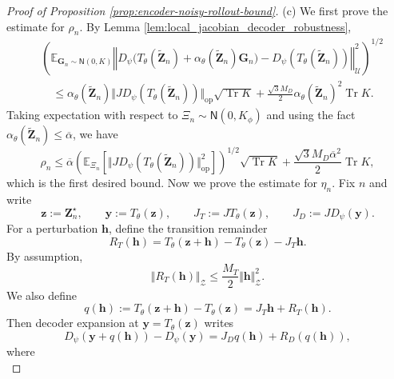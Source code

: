 \documentclass[11pt]{article}
\newcommand{\bbE}{\mathbb{E}}
\newcommand{\wt}{\widetilde}
\newcommand{\ol}{\overline}
\begin{document}
\begin{proof}[Proof of Proposition \ref{prop:encoder-noisy-rollout-bound}]
\item (c) We first prove the estimate for $\rho_n$. By Lemma \ref{lem:local_jacobian_decoder_robustness},
\begin{align*}
    &\left(\bbE_{\mathbf{G}_n\sim\mathsf N(0,K)}\left\Vert D_\psi\bigl(T_\theta(\wt{\mathbf Z}_n)+\alpha_\theta(\wt{\mathbf Z}_n)\mathbf G_n\bigr)-D_\psi(T_\theta(\wt{\mathbf Z}_n))\right\Vert_\mathcal{U}^2\right)^{1/2}\\
    &\quad\leq\alpha_\theta(\wt{\mathbf Z}_n)\Vert JD_\psi(T_\theta(\wt{\mathbf Z}_n))\Vert_\mathrm{op}\sqrt{\operatorname{Tr} K}+\frac{\sqrt{3}M_D}{2}\alpha_\theta(\wt{\mathbf Z}_n)^2\operatorname{Tr} K.
\end{align*}
Taking expectation with respect to $\Xi_n\sim\mathsf N(0,K_\phi)$ and using the fact $\alpha_\theta(\wt{\mathbf Z}_n)\leq\ol\alpha$, we have
\begin{equation*}
    \rho_n\leq\ol\alpha\left(\bbE_{\Xi_n}\left[\Vert JD_\psi(T_\theta(\wt{\mathbf Z}_n))\Vert_\mathrm{op}^2\right]\right)^{1/2}\sqrt{\operatorname{Tr} K}+\frac{\sqrt{3}M_D\ol\alpha^2}{2}\operatorname{Tr} K,
\end{equation*}
which is the first desired bound. Now we prove the estimate for $\eta_n$. Fix $n$ and write
\begin{equation}
    \mathbf{z}:=\mathbf Z_n^\star,\qquad\mathbf{y}:=T_\theta(\mathbf{z}),\qquad J_T:=JT_\theta(\mathbf{z}),\qquad J_D:=JD_\psi(\mathbf{y}).
\end{equation}
For a perturbation $\mathbf{h}$, define the transition remainder
\begin{equation*}
    R_T(\mathbf{h})=T_\theta(\mathbf{z}+\mathbf{h})-T_\theta(\mathbf{z})-J_T\mathbf{h}.
\end{equation*}
By assumption,
\begin{equation*}
    \Vert R_T(\mathbf{h})\Vert_\mathcal{Z}\leq\frac{M_T}{2}\Vert\mathbf{h}\Vert_\mathcal{Z}^2.
\end{equation*}
We also define
\begin{equation}
    q(\mathbf{h}):=T_\theta(\mathbf{z}+\mathbf h)-T_\theta(\mathbf z)=J_T\mathbf{h}+R_T(\mathbf{h}).\label{eq:qremainderdef}
\end{equation}
Then decoder expansion at $\mathbf{y}=T_\theta(\mathbf{z})$ writes
\begin{equation*}
    D_\psi(\mathbf{y}+q(\mathbf h))-D_\psi(\mathbf y)=J_Dq(\mathbf{h})+R_D(q(\mathbf h)),
\end{equation*}
where
\begin{equation*}

\end{equation*}
\end{proof}
\end{document}
